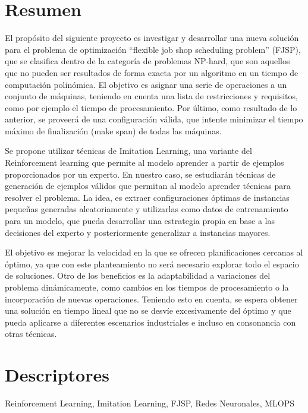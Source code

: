 \section*{Resumen}
El propósito del siguiente proyecto es investigar y desarrollar una nueva solución para el
problema de optimización “flexible job shop scheduling problem” (FJSP), que se clasifica dentro
de la categoría de problemas NP-hard, que son aquellos que no pueden ser resultados de forma
exacta por un algoritmo en un tiempo de computación polinómica. El objetivo es asignar una
serie de operaciones a un conjunto de máquinas, teniendo en cuenta una lista de restricciones
y requisitos, como por ejemplo el tiempo de procesamiento. Por último, como resultado de lo
anterior, se proveerá de una configuración válida, que intente minimizar el tiempo máximo de
finalización (make span) de todas las máquinas.\medskip

Se propone utilizar técnicas de Imitation Learning, una variante del
Reinforcement learning que permite al modelo aprender a partir de ejemplos
proporcionados por un experto. En nuestro caso, se estudiarán técnicas de
generación de ejemplos válidos que permitan al modelo aprender técnicas para
resolver el problema. La idea, es extraer configuraciones óptimas de instancias
pequeñas generadas aleatoriamente y utilizarlas como datos de entrenamiento
para un modelo, que pueda desarrollar una estrategia propia en base a las
decisiones del experto y posteriormente generalizar a instancias
mayores.\medskip

El objetivo es mejorar la velocidad en la que se ofrecen planificaciones
cercanas al óptimo, ya que con este planteamiento no será necesario explorar
todo el espacio de soluciones. Otro de los beneficios es la adaptabilidad a
variaciones del problema dinámicamente, como cambios en los tiempos de
procesamiento o la incorporación de nuevas operaciones. Teniendo esto en
cuenta, se espera obtener una solución en tiempo lineal que no se desvíe
excesivamente del óptimo y que pueda aplicarse a diferentes escenarios
industriales e incluso en consonancia con otras técnicas.

\section*{Descriptores}
Reinforcement Learning, Imitation Learning, FJSP, Redes Neuronales, MLOPS
\pagebreak